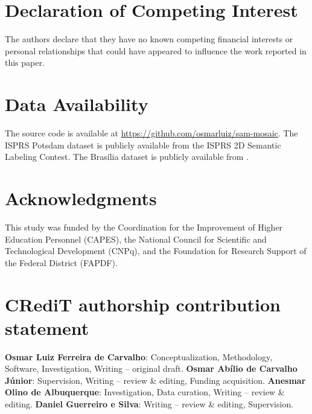 \documentclass[review,11pt,authoryear]{elsarticle}
\begin{document}
\section*{Declaration of Competing Interest}
The authors declare that they have no known competing financial interests or personal relationships that could have appeared to influence the work reported in this paper.

\section*{Data Availability}
The source code is available at \url{https://github.com/osmarluiz/sam-mosaic}. The ISPRS Potsdam dataset is publicly available from the ISPRS 2D Semantic Labeling Contest. The Bras\'{i}lia dataset is publicly available from \citet{carvalho2022panoptic}.

\section*{Acknowledgments}
This study was funded by the Coordination for the Improvement of Higher Education Personnel (CAPES), the National Council for Scientific and Technological Development (CNPq), and the Foundation for Research Support of the Federal District (FAPDF).

\section*{CRediT authorship contribution statement}
\textbf{Osmar Luiz Ferreira de Carvalho}: Conceptualization, Methodology, Software, Investigation, Writing -- original draft.
\textbf{Osmar Ab\'{i}lio de Carvalho J\'{u}nior}: Supervision, Writing -- review \& editing, Funding acquisition.
\textbf{Anesmar Olino de Albuquerque}: Investigation, Data curation, Writing -- review \& editing.
\textbf{Daniel Guerreiro e Silva}: Writing -- review \& editing, Supervision.


\end{document}
